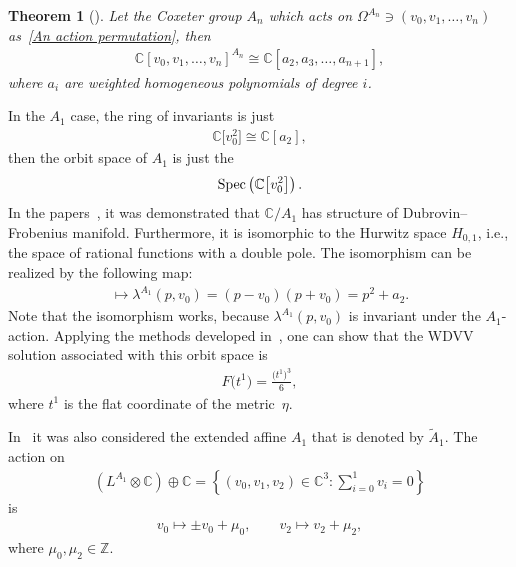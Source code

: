 \documentclass[pdftex]{sigma}%
\numberwithin{equation}{section}
\newtheorem{Theorem}{Theorem}[section]
\begin{document}
\begin{Theorem}[\cite{N.Bourbaki}]
Let the Coxeter group $A_n$ which acts on $\Omega^{A_n}\ni (v_0,v_1,\dots,v_n)$ as~\eqref{An action permutation}, then
\begin{gather*}
\mathbb{C}[v_0,v_1,\dots,v_n]^{A_n}\cong \mathbb{C}[a_2,a_3,\dots,a_{n+1}],
\end{gather*}
where $a_i$ are weighted homogeneous polynomials of degree $i$.
\end{Theorem}

 In the $A_1$ case, the ring of invariants is just
\begin{gather*}
\mathbb{C}\big[v_0^2\big]\cong\mathbb{C}[a_2] ,
\end{gather*}
 then the orbit space of $A_1$ is just the
 \begin{gather*}
 \mathop{\rm Spec} \left(\mathbb{C}\big[v_0^2\big]\right).
 \end{gather*}
 In the papers~\cite{B.Dubrovin2,B.Dubrovin1}, it was demonstrated that $\mathbb{C}/A_1$ has structure of Dubrovin--Frobenius manifold. Furthermore, it is isomorphic to the Hurwitz space $H_{0,1}$, i.e., the space of rational functions with a double pole. The isomorphism can be realized by the following map:
\begin{gather*}
[v_0]\mapsto \lambda^{A_1}(p,v_0)=(p-v_0)(p+v_0)=p^2+a_2.
\end{gather*}
Note that the isomorphism works, because $\lambda^{A_1}(p,v_0)$ is invariant under the $A_1$-action. Applying the methods developed in~\cite{B.Dubrovin2,B.Dubrovin1}, one can show that the WDVV solution associated with this orbit space is
\begin{gather*}
F\big(t^1\big)=\frac{\big(t^1\big)^3}{6},
\end{gather*}
where $t^1$ is the flat coordinate of the metric~$\eta$.

In~\cite{B.Dubrovin2, B.DubrovinandY.Zhang} it was also considered the extended affine $A_1$ that is denoted by $\tilde A_1$. The action on
\begin{gather*}
\left(L^{A_1}\otimes\mathbb{C}\right)\oplus \mathbb{C}
=\left\{(v_0,v_1,v_2)\in \mathbb{C}^3\colon \sum_{i=0}^1 v_i=0 \right\}
\end{gather*}
is{\samepage
\begin{gather*}
v_0\mapsto \pm v_0+\mu_0,\qquad
v_2\mapsto v_2+\mu_2,
\end{gather*}
where $\mu_0, \mu_2 \in \mathbb{Z}$.}
\end{document}
